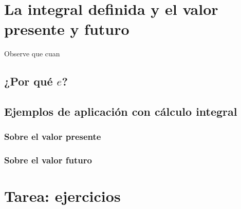 \documentclass{article}
\begin{document}
        \section{La integral definida y el valor presente y futuro}

        Observe que cuan

            \subsection{¿Por qué $e$?}


            \subsection{Ejemplos de aplicación con cálculo integral}

                \subsubsection{Sobre el valor presente}

                \subsubsection{Sobre el valor futuro}
        \section{Tarea: ejercicios}
\end{document}
